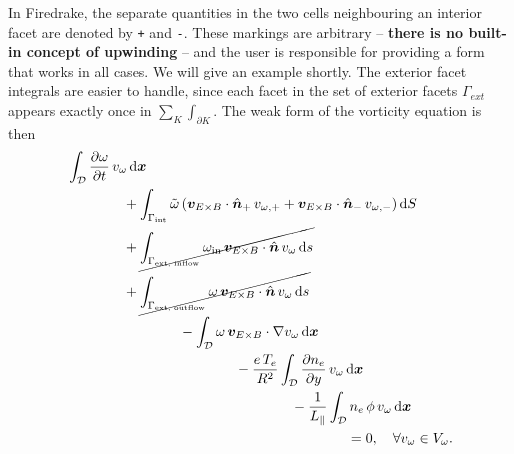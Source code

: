 \documentclass[12pt]{article}
\begin{document}
%
In Firedrake, the separate quantities in the two cells neighbouring an interior facet are denoted by \texttt{+} and \texttt{-}. These markings are arbitrary – \textbf{there is no built-in concept of upwinding} – and the user is responsible for providing a form that works in all cases. We will give an example shortly. The exterior facet integrals are easier to handle, since each facet in the set of exterior facets $\Gamma_{ext}$ appears exactly once in $\sum_K \int_{\partial K}$. The weak form of the vorticity equation is then
%
\begin{equation}
    \begin{aligned}
        & \int_\mathcal{D} \frac{\partial \omega}{\partial t} \, v_\omega \, \mathrm{d}\bm{x} \\
        & \hspace{4em} + \int_{\Gamma_\text{int}} \tilde{\omega} \, ( \bm{v}_{E \times B} \cdot \hat{\bm{n}}_+ \, v_{\omega,+} + \bm{v}_{E \times B} \cdot \hat{\bm{n}}_- \, v_{\omega,-} ) \, \mathrm{d}S \\
        & \hspace{4em} + \cancel{ \int_{\Gamma_\text{ext, inflow}} \omega_\text{in} \, \bm{v}_{E \times B} \cdot \hat{\bm{n}} \, v_\omega \, \mathrm{d}s } \\
        & \hspace{4em} + \cancel{ \int_{\Gamma_\text{ext, outflow}} \omega \, \bm{v}_{E \times B} \cdot \hat{\bm{n}} \, v_\omega \, \mathrm{d}s } \\
        & \hspace{8em} - \int_\mathcal{D} \omega \, \bm{v}_{E \times B} \cdot \nabla v_\omega \, \mathrm{d}\bm{x} \\
        & \hspace{12em} - \frac{e \, T_e}{R^2} \int_\mathcal{D} \frac{\partial n_e}{\partial y} \, v_\omega \, \mathrm{d}\bm{x} \\
        & \hspace{16em} - \frac{1}{L_\parallel} \int_\mathcal{D} n_e \, \phi \, v_\omega \, \mathrm{d}\bm{x} \\
        & \hspace{20em} = 0 , \quad \forall v_\omega \in V_\omega .
    \end{aligned}
\end{equation}
\end{document}
